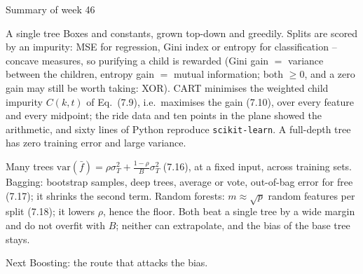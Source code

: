 \documentclass[10pt,aspectratio=169]{beamer}
\newcommand{\var}{\mathrm{var}}
\begin{document}
\begin{frame}{Summary of week 46}
\small
\begin{block}{A single tree}
Boxes and constants, grown top-down and greedily.  Splits are scored by an
impurity: MSE for regression, Gini index or entropy for classification --
concave measures, so purifying a child is rewarded (Gini gain $=$ variance
between the children, entropy gain $=$ mutual information; both $\ge0$, and
a zero gain may still be worth taking: XOR).  CART minimises the weighted
child impurity $C(k,t)$ of Eq.\ (7.9), i.e.\ maximises the gain (7.10),
over every feature and every midpoint; the ride data and ten points in the
plane showed the arithmetic, and sixty lines of Python reproduce
\texttt{scikit-learn}.  A full-depth tree has zero training error and large
variance.
\end{block}
\begin{block}{Many trees}
$\var(\bar f)=\rho\sigma_T^2+\tfrac{1-\rho}{B}\sigma_T^2$ (7.16), at a
fixed input, across training sets.  Bagging: bootstrap samples, deep trees,
average or vote, out-of-bag error for free (7.17); it shrinks the second
term.  Random forests: $m\approx\sqrt p$ random features per split (7.18);
it lowers $\rho$, hence the floor.  Both beat a single tree by a wide margin
and do not overfit with $B$; neither can extrapolate, and the bias of the
base tree stays.
\end{block}
\begin{block}{Next}
Boosting: the route that attacks the bias.
\end{block}
\end{frame}
\end{document}
